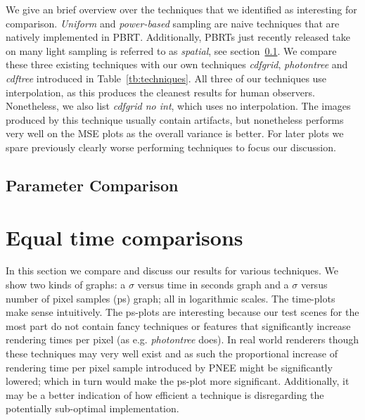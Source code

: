We give an brief overview over the techniques that we identified as interesting for comparison. \textit{Uniform} and \textit{power-based} sampling are naive techniques that are natively implemented in PBRT. Additionally, PBRTs just recently released take on many light sampling is referred to as \textit{spatial}, see section~\ref{}. We compare these three existing techniques with our own techniques \textit{cdfgrid}, \textit{photontree} and \textit{cdftree} introduced in Table~\ref{tb:techniques}. All three of our techniques use interpolation, as this produces the cleanest results for human observers. Nonetheless, we also list \textit{cdfgrid no int}, which uses no interpolation. The images produced by this technique usually contain artifacts, but nonetheless performs very well on the MSE plots as the overall variance is better. For later plots we spare previously clearly worse performing techniques to focus our discussion.

\subsection{Parameter Comparison}


\label{ch:ev:photontree}

\label{ch:ev:cdftree}


\label{ch:ev:photonsampling}


\label{ch:ev:uniformfloor}


\section{Equal time comparisons}
\label{sec:etc}
In this section we compare and discuss our results for various techniques. We show two kinds of graphs: a $\sigma$ versus time in seconds graph and a $\sigma$ versus number of pixel samples (ps) graph; all in logarithmic scales. The time-plots make sense intuitively. The ps-plots are interesting because our test scenes for the most part do not contain fancy techniques or features that significantly increase rendering times per pixel (as e.g. \textit{photontree} does). In real world renderers though these techniques may very well exist and as such the proportional increase of rendering time per pixel sample introduced by PNEE might be significantly lowered; which in turn would make the ps-plot more significant. Additionally, it may be a better indication of how efficient a technique is disregarding the potentially sub-optimal implementation.

